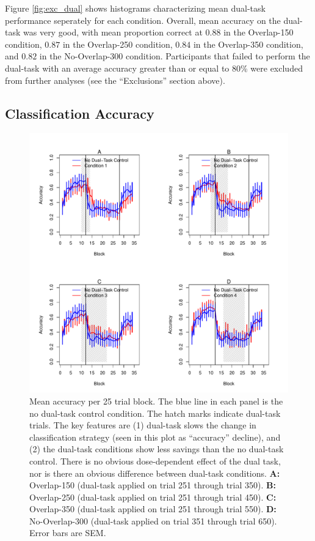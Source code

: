 \documentclass[apacite,draftfirst,man]{apa6}
\begin{document}
Figure \ref{fig:exc_dual} shows histograms characterizing mean dual-task
performance seperately for each condition. Overall, mean accuracy on the
dual-task was very good, with mean proportion correct at $0.88$ in the
Overlap-150 condition, $0.87$ in the Overlap-250 condition, $0.84$ in the
Overlap-350 condition, and $0.82$ in the No-Overlap-300 condition. Participants
that failed to perform the dual-task with an average accuracy greater than or
equal to 80\% were excluded from further analyses (see the ``Exclusions''
section above).

\subsection*{Classification Accuracy}
\begin{figure}[t]
\centering \includegraphics[width=1.0\textwidth]{../figures/fig_learning_curves.pdf}
\caption{ Mean accuracy per 25 trial block. The blue line in each panel is
  the no dual-task control condition. The hatch marks indicate dual-task trials.
  The key features are (1) dual-task slows the change in classification strategy
  (seen in this plot as ``accuracy'' decline), and (2) the dual-task conditions
  show less savings than the no dual-task control. There is no obvious
  dose-dependent effect of the dual task, nor is there an obvious difference
  between dual-task conditions.
  \textbf{A:} Overlap-150 (dual-task applied on trial 251 through trial 350).
  \textbf{B:} Overlap-250 (dual-task applied on trial 251 through trial 450).
  \textbf{C:} Overlap-350 (dual-task applied on trial 251 through trial 550).
  \textbf{D:} No-Overlap-300 (dual-task applied on trial 351 through trial 650).
  Error bars are SEM. }
  \label{fig:learning_curves}
\end{figure}
\end{document}
